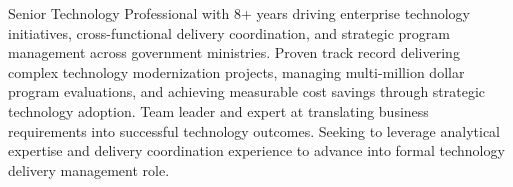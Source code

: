 
\begin{cvparagraph}
Senior Technology Professional with 8+ years driving enterprise technology initiatives, cross-functional delivery coordination, and strategic program management across government ministries. Proven track record delivering complex technology modernization projects, managing multi-million dollar program evaluations, and achieving measurable cost savings through strategic technology adoption. Team leader and expert at translating business requirements into successful technology outcomes. Seeking to leverage analytical expertise and delivery coordination experience to advance into formal technology delivery management role.
\end{cvparagraph}